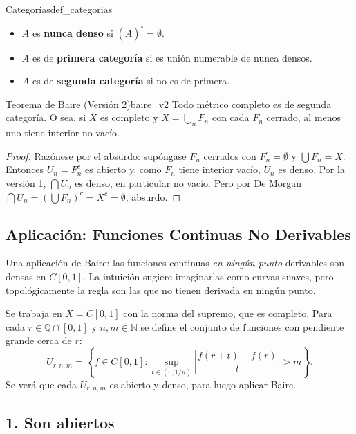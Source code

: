 \documentclass[11pt, a4paper]{article}
\begin{document}
\begin{definicion}{Categorías}{def_categorias}
    \begin{itemize}
        \item $A$ es \textbf{nunca denso} si $(\overline{A})^\circ = \emptyset$.
        \item $A$ es de \textbf{primera categoría} si es unión numerable de nunca densos.
        \item $A$ es de \textbf{segunda categoría} si no es de primera.
    \end{itemize}
\end{definicion}

\begin{teorema}{Teorema de Baire (Versión 2)}{baire_v2}
Todo métrico completo es de segunda categoría. O sea, si $X$ es completo y $X = \bigcup_n F_n$
con cada $F_n$ cerrado, al menos uno tiene interior no vacío.
\end{teorema}

\begin{proof}
Razónese por el absurdo: supóngase $F_n$ cerrados con $F_n^\circ = \emptyset$ y $\bigcup F_n = X$. Entonces
$U_n = F_n^c$ es abierto y, como $F_n$ tiene interior vacío, $U_n$ es denso. Por la versión 1,
$\bigcap U_n$ es denso, en particular no vacío. Pero por De Morgan
$\bigcap U_n = (\bigcup F_n)^c = X^c = \emptyset$, absurdo.
\end{proof}

\subsection{Aplicación: Funciones Continuas No Derivables}

Una aplicación de Baire: las funciones continuas \emph{en ningún punto} derivables son
densas en $C[0,1]$. La intuición sugiere imaginarlas como curvas suaves, pero topológicamente la
regla son las que no tienen derivada en ningún punto.

Se trabaja en $X = C[0,1]$ con la norma del supremo, que es completo. Para cada
$r \in \mathbb{Q} \cap [0, 1]$ y $n, m \in \mathbb{N}$ se define el conjunto de funciones con
pendiente grande cerca de $r$:
$$ U_{r,n,m} = \left\{ f \in C[0,1] : \sup_{t \in (0, 1/n)} \left| \frac{f(r+t) - f(r)}{t} \right| >
m \right\}. $$
Se verá que cada $U_{r,n,m}$ es abierto y denso, para luego aplicar Baire.

\subsection*{1. Son abiertos}
\end{document}
